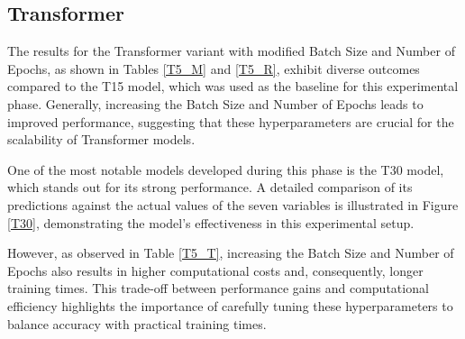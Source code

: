 \subsection{Transformer}
The results for the Transformer variant with modified Batch Size and Number of Epochs, as shown in Tables \ref{T5_M} and \ref{T5_R}, exhibit diverse outcomes compared to the T15 model, which was used as the baseline for this experimental phase. Generally, increasing the Batch Size and Number of Epochs leads to improved performance, suggesting that these hyperparameters are crucial for the scalability of Transformer models.

One of the most notable models developed during this phase is the T30 model, which stands out for its strong performance. A detailed comparison of its predictions against the actual values of the seven variables is illustrated in Figure \ref{T30}, demonstrating the model's effectiveness in this experimental setup.

However, as observed in Table \ref{T5_T}, increasing the Batch Size and Number of Epochs also results in higher computational costs and, consequently, longer training times. This trade-off between performance gains and computational efficiency highlights the importance of carefully tuning these hyperparameters to balance accuracy with practical training times.
    

    

